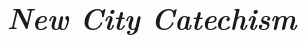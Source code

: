 \documentclass[00-main.tex]{subfiles}
\begin{document}
\chapter{\em New City Catechism}







\cleardoublepage
\end{document}

